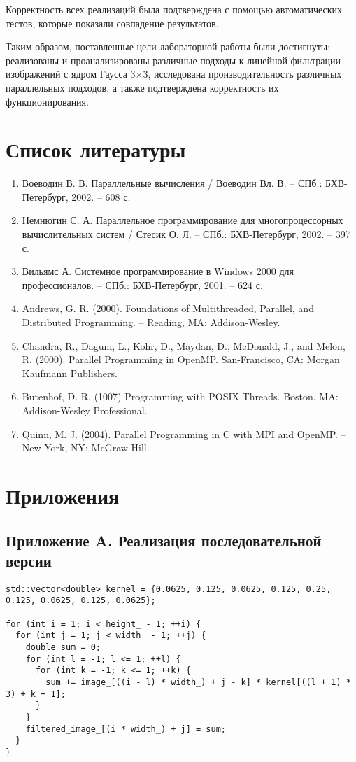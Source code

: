 \documentclass[14pt, a4paper]{extarticle}
\begin{document}
Корректность всех реализаций была подтверждена с помощью автоматических тестов, которые показали совпадение результатов.

Таким образом, поставленные цели лабораторной работы были достигнуты: реализованы и проанализированы различные подходы к линейной фильтрации изображений с ядром Гаусса 3×3, исследована производительность различных параллельных подходов, а также подтверждена корректность их функционирования.

\newpage

\section*{Список литературы}
\begin{enumerate}
  \item Воеводин В. В. Параллельные вычисления / Воеводин Вл. В. – СПб.: БХВ-Петербург, 2002. – 608 с.
  \item Немнюгин С. А. Параллельное программирование для многопроцессорных вычислительных систем / Стесик О. Л. – СПб.: БХВ-Петербург, 2002. – 397 с.
  \item Вильямс А. Системное программирование в Windows 2000 для профессионалов. – СПб.: БХВ-Петербург, 2001. – 624 с.
  \item Andrews, G. R. (2000). Foundations of Multithreaded, Parallel, and Distributed Programming. – Reading, MA: Addison-Wesley.
  \item Chandra, R., Dagum, L., Kohr, D., Maydan, D., McDonald, J., and Melon, R. (2000). Parallel Programming in OpenMP. San-Francisco, CA: Morgan Kaufmann Publishers.
  \item Butenhof, D. R. (1007) Programming with POSIX Threads. Boston, MA: Addison-Wesley Professional.
  \item Quinn, M. J. (2004). Parallel Programming in C with MPI and OpenMP. – New York, NY: McGraw-Hill.
\end{enumerate}

\newpage

\section*{Приложения}

\subsection*{Приложение A. Реализация последовательной версии}
\begin{lstlisting}
std::vector<double> kernel = {0.0625, 0.125, 0.0625, 0.125, 0.25, 0.125, 0.0625, 0.125, 0.0625};

for (int i = 1; i < height_ - 1; ++i) {
  for (int j = 1; j < width_ - 1; ++j) {
    double sum = 0;
    for (int l = -1; l <= 1; ++l) {
      for (int k = -1; k <= 1; ++k) {
        sum += image_[((i - l) * width_) + j - k] * kernel[((l + 1) * 3) + k + 1];
      }
    }
    filtered_image_[(i * width_) + j] = sum;
  }
}
\end{lstlisting}
\end{document}
